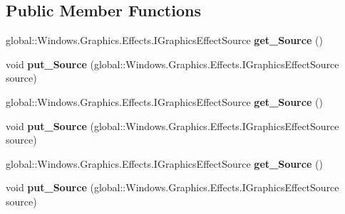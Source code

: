 \subsection*{Public Member Functions}
\begin{DoxyCompactItemize}
\item 
\mbox{\label{interface_microsoft_1_1_graphics_1_1_canvas_1_1_effects_1_1_i_invert_effect_a2adc52ee21ca538da6e97ba19558690f}} 
global\+::\+Windows.\+Graphics.\+Effects.\+I\+Graphics\+Effect\+Source {\bfseries get\+\_\+\+Source} ()
\item 
\mbox{\label{interface_microsoft_1_1_graphics_1_1_canvas_1_1_effects_1_1_i_invert_effect_aa092eefd8f15e6bf82ca0bd15e45340e}} 
void {\bfseries put\+\_\+\+Source} (global\+::\+Windows.\+Graphics.\+Effects.\+I\+Graphics\+Effect\+Source source)
\item 
\mbox{\label{interface_microsoft_1_1_graphics_1_1_canvas_1_1_effects_1_1_i_invert_effect_a2adc52ee21ca538da6e97ba19558690f}} 
global\+::\+Windows.\+Graphics.\+Effects.\+I\+Graphics\+Effect\+Source {\bfseries get\+\_\+\+Source} ()
\item 
\mbox{\label{interface_microsoft_1_1_graphics_1_1_canvas_1_1_effects_1_1_i_invert_effect_aa092eefd8f15e6bf82ca0bd15e45340e}} 
void {\bfseries put\+\_\+\+Source} (global\+::\+Windows.\+Graphics.\+Effects.\+I\+Graphics\+Effect\+Source source)
\item 
\mbox{\label{interface_microsoft_1_1_graphics_1_1_canvas_1_1_effects_1_1_i_invert_effect_a2adc52ee21ca538da6e97ba19558690f}} 
global\+::\+Windows.\+Graphics.\+Effects.\+I\+Graphics\+Effect\+Source {\bfseries get\+\_\+\+Source} ()
\item 
\mbox{\label{interface_microsoft_1_1_graphics_1_1_canvas_1_1_effects_1_1_i_invert_effect_aa092eefd8f15e6bf82ca0bd15e45340e}} 
void {\bfseries put\+\_\+\+Source} (global\+::\+Windows.\+Graphics.\+Effects.\+I\+Graphics\+Effect\+Source source)

\end{DoxyCompactItemize}
